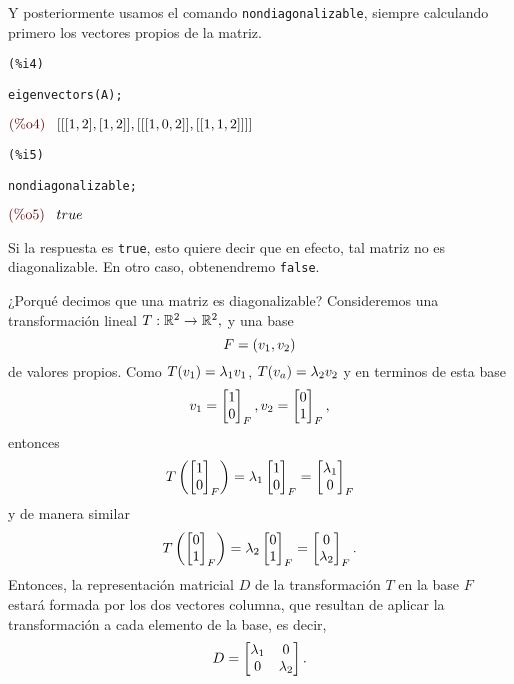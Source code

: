 \begin{solucion}
Y posteriormente usamos el comando \texttt{nondiagonalizable}, siempre calculando primero los vectores propios de la
matriz.


\noindent
%
\begin{minipage}{8ex}{\color{red}\bf
\begin{verbatim}
(%i4)
\end{verbatim}}
\end{minipage}
\begin{minipage}{\textwidth}{\color{blue}
\begin{verbatim}
eigenvectors(A);
\end{verbatim}}
\end{minipage}
\begin{math}\displaystyle
\parbox{8ex}{\color{labelcolor}(\%o4) }
[[[1,2],[1,2]],[[[1,0,2]],[[1,1,2]]]]
\end{math}
%

\noindent
%
\begin{minipage}{8ex}{\color{red}\bf
\begin{verbatim}
(%i5)
\end{verbatim}}
\end{minipage}
\begin{minipage}{\textwidth}{\color{blue}
\begin{verbatim}
nondiagonalizable;
\end{verbatim}}
\end{minipage}
\begin{math}\displaystyle
\parbox{8ex}{\color{labelcolor}(\%o5) }
true
\end{math}
%

Si la respuesta es \texttt{true}, esto quiere decir que en efecto, tal matriz no es diagonalizable. En otro caso,
obtenendremo \texttt{false}.
\end{solucion}

¿Porqué decimos que una matriz es diagonalizable? Consideremos una transformación lineal $T:\mathbb{R}^{2}\to
\mathbb{R}^{2},$ y una base $$
F=\left( v_{1}, v_{2} \right)
$$
de valores propios. Como $T(v_{1})=\lambda_{1} v_{1}$, $T(v_{a})=\lambda_{2} v_{2}$ y en terminos de esta base
$$
v_{1}=\begin{bmatrix}1\\0\end{bmatrix}_{F}, v_{2}=\begin{bmatrix}0\\1\end{bmatrix}_{F},
$$
entonces
$$
T\left( \begin{bmatrix}1\\0\end{bmatrix}_{F} \right)=\lambda_{1}\begin{bmatrix}1\\0\end{bmatrix}_{F}=\begin{bmatrix}\lambda_{1}\\0\end{bmatrix}_{F}
$$
y de manera similar
$$
T\left( \begin{bmatrix}0\\1\end{bmatrix}_{F} \right)=\lambda_{2}\begin{bmatrix}0\\1\end{bmatrix}_{F}=\begin{bmatrix}0\\\lambda_{2}\end{bmatrix}_{F}.
$$
Entonces, la representación matricial $D$ de la transformación $T$ en la base $F$ estará formada por los dos vectores
columna, que resultan de aplicar la transformación a cada elemento de la base, es decir,
$$
D=\begin{bmatrix}\lambda_{1} & 0 \\ 0 & \lambda_{2}\end{bmatrix}.
$$

